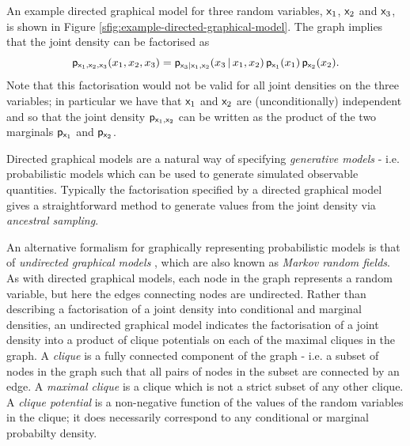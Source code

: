 An example directed graphical model for three random variables, $\mathsf{x}_1$, $\mathsf{x}_2$ and $\mathsf{x}_3$, is shown in Figure \ref{sfig:example-directed-graphical-model}. The graph implies that the joint density can be factorised as
\begin{equation}\label{eq:example-directed-graphical-model-factorisation}
  \mathsf{p}_{\mathsf{x}_1,\mathsf{x}_2,\mathsf{x}_3}(x_1,x_2,x_3) = 
  \mathsf{p}_{\mathsf{x}_3|\mathsf{x}_1,\mathsf{x}_2}(x_3 \operatorname{|} x_1,x_2) \,
  \mathsf{p}_{\mathsf{x}_1}(x_1) \, \mathsf{p}_{\mathsf{x}_2}(x_2).
\end{equation}
Note that this factorisation would not be valid for all joint densities on the three variables; in particular we have that $\mathsf{x}_1$ and $\mathsf{x}_2$ are (unconditionally) independent and so that the joint density $\mathsf{p}_{\mathsf{x}_1,\mathsf{x}_2}$ can be written as the product of the two marginals $\mathsf{p}_{\mathsf{x}_1}$ and $\mathsf{p}_{\mathsf{x}_2}$.

Directed graphical models are a natural way of specifying \emph{generative models} - i.e. probabilistic models which can be used to generate simulated observable quantities. Typically the factorisation specified by a directed graphical model gives a straightforward method to generate values from the joint density via \emph{ancestral sampling}.

An alternative formalism for graphically representing probabilistic models is that of \emph{undirected graphical models} \citep{kindermann1980markov}, which are also known as \emph{Markov random fields}. As with directed graphical models, each node in the graph represents a random variable, but here the edges connecting nodes are undirected. Rather than describing a factorisation of a joint density into conditional and marginal densities, an undirected graphical model indicates the factorisation of a joint density into a product of clique potentials on each of the maximal cliques in the graph. A \emph{clique} is a fully connected component of the graph - i.e. a subset of nodes in the graph such that all pairs of nodes in the subset are connected by an edge. A \emph{maximal clique} is a clique which is not a strict subset of any other clique. A \emph{clique potential} is a non-negative function of the values of the random variables in the clique; it does necessarily correspond to any conditional or marginal probabilty density. 

